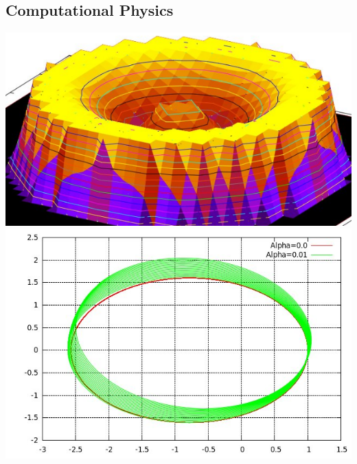\documentclass[../r.tex]{subfiles}
\begin{document}
\subsection{Computational Physics}
\noindent
\includegraphics[scale=0.3]{../scientific/bundt.png} 
\includegraphics[scale=0.25]{../scientific/chaotic_orbits.png} 
\end{document}
